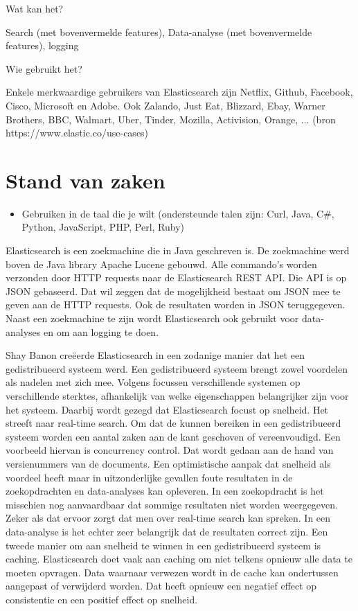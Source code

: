 {Wat kan het? 

Search (met bovenvermelde features), Data-analyse (met bovenvermelde features), logging 

Wie gebruikt het? 

Enkele merkwaardige gebruikers van Elasticsearch zijn Netflix, Github, Facebook, Cisco, Microsoft en Adobe. Ook Zalando, Just Eat, Blizzard, Ebay, Warner Brothers, BBC, Walmart, Uber, Tinder, Mozilla, Activision, Orange, ... (bron https://www.elastic.co/use-cases)

\section{Stand van zaken}
\label{sec:stand-van-zaken}


\begin{itemize}
	\item Gebruiken in de taal die je wilt (ondersteunde talen zijn: Curl, Java, C\#, Python, JavaScript, PHP, Perl, Ruby)
	
\end{itemize}

Elasticsearch is een zoekmachine die in Java geschreven is. De zoekmachine werd boven de Java library Apache Lucene gebouwd. Alle commando's worden verzonden door HTTP requests naar de Elasticsearch REST API. Die API is op JSON gebaseerd. Dat wil zeggen dat de mogelijkheid bestaat om JSON mee te geven aan de HTTP requests. Ook de resultaten worden in JSON teruggegeven. Naast een zoekmachine te zijn wordt Elasticsearch ook gebruikt voor data-analyses en om aan logging te doen. 

Shay Banon creëerde Elasticsearch in een zodanige manier dat het een gedistribueerd systeem werd. Een gedistribueerd systeem brengt zowel voordelen als nadelen met zich mee. Volgens \textcite{Brasetvik2013s} focussen verschillende systemen op verschillende sterktes, afhankelijk van welke eigenschappen belangrijker zijn voor het systeem. Daarbij wordt gezegd dat Elasticsearch focust op snelheid. Het streeft naar real-time search. Om dat de kunnen bereiken in een gedistribueerd systeem worden een aantal zaken aan de kant geschoven of vereenvoudigd. Een voorbeeld hiervan is concurrency control. Dat wordt gedaan aan de hand van versienummers van de documents. Een optimistische aanpak dat snelheid als voordeel heeft maar in uitzonderlijke gevallen foute resultaten in de zoekopdrachten en data-analyses kan opleveren. In een zoekopdracht is het misschien nog aanvaardbaar dat sommige resultaten niet worden weergegeven. Zeker als dat ervoor zorgt dat men over real-time search kan spreken. In een data-analyse is het echter zeer belangrijk dat de resultaten correct zijn. Een tweede manier om aan snelheid te winnen in een gedistribueerd systeem is caching. Elasticsearch doet vaak aan caching om niet telkens opnieuw alle data te moeten opvragen. Data waarnaar verwezen wordt in de cache kan ondertussen aangepast of verwijderd worden. Dat heeft opnieuw een negatief effect op consistentie en een positief effect op snelheid.

}

